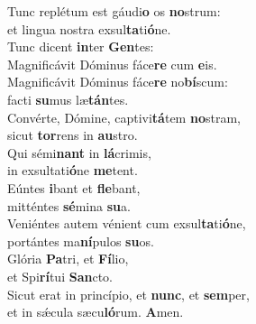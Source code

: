 \evenverse Tunc replétum est gáudi\textbf{o} os \textbf{no}strum:~\*\\
\evenverse et lingua nostra exsul\textbf{ta}ti\textbf{ó}ne.\\
\oddverse Tunc dicent \textbf{in}ter \textbf{Gen}tes:~\*\\
\oddverse Magnificávit Dóminus fáce\textbf{re} cum \textbf{e}is.\\
\evenverse Magnificávit Dóminus fáce\textbf{re} no\textbf{bí}scum:~\*\\
\evenverse facti \textbf{su}mus læ\textbf{tán}tes.\\
\oddverse Convérte, Dómine, captivi\textbf{tá}tem \textbf{no}stram,~\*\\
\oddverse sicut \textbf{tor}rens in \textbf{au}stro.\\
\evenverse Qui sémi\textbf{nant} in \textbf{lá}crimis,~\*\\
\evenverse in exsultati\textbf{ó}ne \textbf{me}tent.\\
\oddverse Eúntes \textbf{i}bant et \textbf{fle}bant,~\*\\
\oddverse mitténtes \textbf{sé}mina \textbf{su}a.\\
\evenverse Veniéntes autem vénient cum exsul\textbf{ta}ti\textbf{ó}ne,~\*\\
\evenverse portántes ma\textbf{ní}pulos \textbf{su}os.\\
\oddverse Glória \textbf{Pa}tri, et \textbf{Fí}lio,~\*\\
\oddverse et Spi\textbf{rí}tui \textbf{San}cto.\\
\evenverse Sicut erat in princípio, et \textbf{nunc}, et \textbf{sem}per,~\*\\
\evenverse et in sǽcula sæcu\textbf{ló}rum. \textbf{A}men.\\
